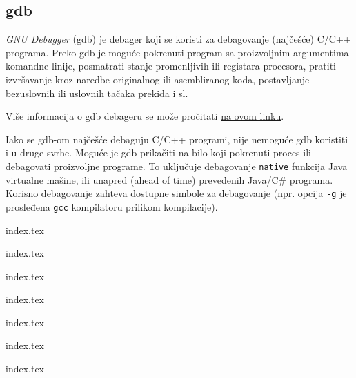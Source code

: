 \subsection{gdb}\label{gdb}

\emph{GNU Debugger} (gdb) je debager koji se koristi za debagovanje (najčešće) C/C++ programa. Preko gdb je moguće pokrenuti program sa proizvoljnim argumentima komandne linije, posmatrati stanje promenljivih ili registara procesora, pratiti izvršavanje kroz naredbe originalnog ili asembliranog koda, postavljanje bezuslovnih ili uslovnih tačaka prekida i sl.

Više informacija o gdb debageru se može pročitati \href{https://www.sourceware.org/gdb/}{na ovom linku}.

Iako se gdb-om najčešće debaguju C/C++ programi, nije nemoguće gdb koristiti i u druge svrhe. Moguće je gdb prikačiti na bilo koji pokrenuti proces ili debagovati proizvoljne programe. To uključuje debagovanje \texttt{native} funkcija Java virtualne mašine, ili unapred (ahead of time) prevedenih Java/C\# programa. Korisno debagovanje zahteva dostupne simbole za debagovanje (npr. opcija \texttt{-g} je prosleđena \texttt{gcc} kompilatoru prilikom kompilacije).

{index.tex}

{index.tex}

{index.tex}

{index.tex}

{index.tex}

{index.tex}

{index.tex}
